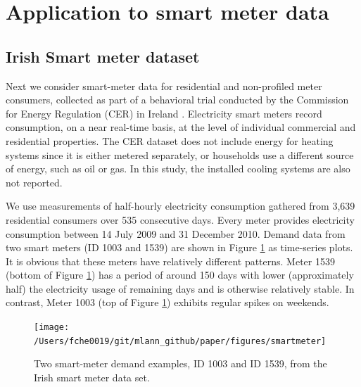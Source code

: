 \documentclass[11pt,a4paper,]{article}
\begin{document}
\hypertarget{smartmeter}{%
\section{Application to smart meter data}\label{smartmeter}}

\hypertarget{irish-smart-meter-dataset}{%
\subsection{Irish Smart meter dataset}\label{irish-smart-meter-dataset}}

Next we consider smart-meter data for residential and non-profiled meter consumers, collected as part of a behavioral trial conducted by the Commission for Energy Regulation (CER) in Ireland \autocite{Commission_For_Energy_Regulation2011-ub}. Electricity smart meters record consumption, on a near real-time basis, at the level of individual commercial and residential properties. The CER dataset does not include energy for heating systems since it is either metered separately, or households use a different source of energy, such as oil or gas. In this study, the installed cooling systems are also not reported.

We use measurements of half-hourly electricity consumption gathered from 3,639 residential consumers over 535 consecutive days. Every meter provides electricity consumption between 14 July 2009 and 31 December 2010. Demand data from two smart meters (ID 1003 and 1539) are shown in Figure \ref{fig:smartmeter} as time-series plots. It is obvious that these meters have relatively different patterns. Meter 1539 (bottom of Figure \ref{fig:smartmeter}) has a period of around 150 days with lower (approximately half) the electricity usage of remaining days and is otherwise relatively stable. In contrast, Meter 1003 (top of Figure \ref{fig:smartmeter}) exhibits regular spikes on weekends.

\begin{figure}

{\centering \texttt{[image: /Users/fche0019/git/mlann\_github/paper/figures/smartmeter]} 

}

\caption{Two smart-meter demand examples, ID 1003 and ID 1539, from the Irish smart meter data set.}\label{fig:smartmeter}
\end{figure}
\end{document}

